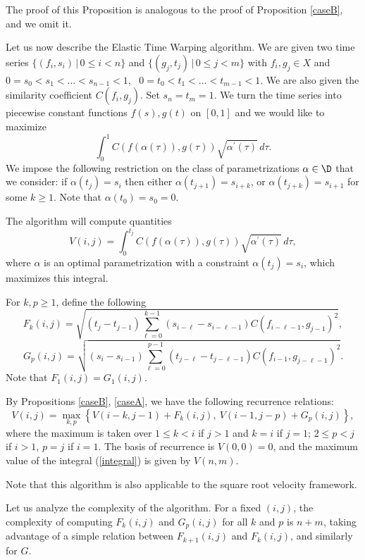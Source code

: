 \documentclass[12pt]{amsart}
\begin{document}
The proof of this Proposition is analogous to the proof of Proposition \ref{caseB}, and we omit it.

Let us now describe the Elastic Time Warping algorithm. We are given two time series $\{ (f_i, s_i) \,|\, 0 \leq i < n \}$ and 
$\{ (g_j, t_j) \,|\, 0 \leq j < m \}$ with $f_i, g_j \in X$ and $0 = s_0 < s_1 < \ldots < s_{n-1} < 1$, \ $0 = t_0 < t_1 < \ldots < t_{m-1} < 1$. We are also given the similarity coefficient $C(f_i, g_j)$. Set $s_n = t_m = 1$.
We turn the time series into piecewise constant functions $f(s), g(t)$ on $[0,1]$ and we would like to maximize
\begin{equation}
\label{integral}
\int_0^1 C(f(\alpha(\tau)), g(\tau)) \sqrt{\alpha^\prime(\tau)} \,d \tau.
\end{equation}  
We impose the following restriction on the class of parametrizations $\alpha \in \D$ that we consider:
if $\alpha(t_j) = s_i$ then either $\alpha(t_{j+1}) = s_{i+k}$, or $\alpha(t_{j+k}) = s_{i+1}$ for some $k \geq 1$. Note that $\alpha(t_0) = s_0 = 0$.  

The algorithm will compute quantities
\[V(i, j) = \int_{0}^{t_j} C(f(\alpha(\tau)), g(\tau)) \sqrt{\alpha^\prime(\tau)} \,d \tau,\]
where $\alpha$ is an optimal parametrization with a constraint $\alpha(t_j) = s_i$, which maximizes this integral.

For $k, p \geq 1$, define the following
\[F_k(i, j) = \sqrt{(t_j - t_{j-1}) \sum_{\ell = 0}^{k-1} (s_{i-\ell} - s_{i - \ell -1}) C(f_{i-\ell-1}, g_{j-1})^2},\]
\[G_p(i, j) = \sqrt{(s_i - s_{i-1}) \sum_{\ell = 0}^{p-1} (t_{j-\ell} - t_{j - \ell -1}) C(f_{i-1}, g_{j-\ell-1})^2}.\]
Note that $F_1(i,j) = G_1(i,j)$.
 
By Propositions \ref{caseB}, \ref{caseA}, we have the following recurrence relations:
\[V(i,j) = \max\limits_{k, p} \left\{ V(i-k,j-1) + F_k(i, j), \ V(i-1, j-p) + G_p(i, j) \right\},\]
where the maximum is taken over $1\leq k < i$ if $j > 1$ and $k = i$ if $j=1$; $2\leq p < j$ if $i > 1$, $p = j$ if $i=1$.
The basis of recurrence is $V(0,0) = 0$, and the maximum value of the integral (\ref{integral}) is given by $V(n, m)$.

Note that this algorithm is also applicable to the square root velocity framework.

Let us analyze the complexity of the algorithm. For a fixed $(i, j)$, the complexity of computing $F_k(i, j)$ and $G_p(i, j)$ for all $k$ and $p$ is $n + m$, taking advantage of a simple relation between $F_{k+1}(i, j)$ and $F_k(i,j)$, and similarly for $G$.
\end{document}
